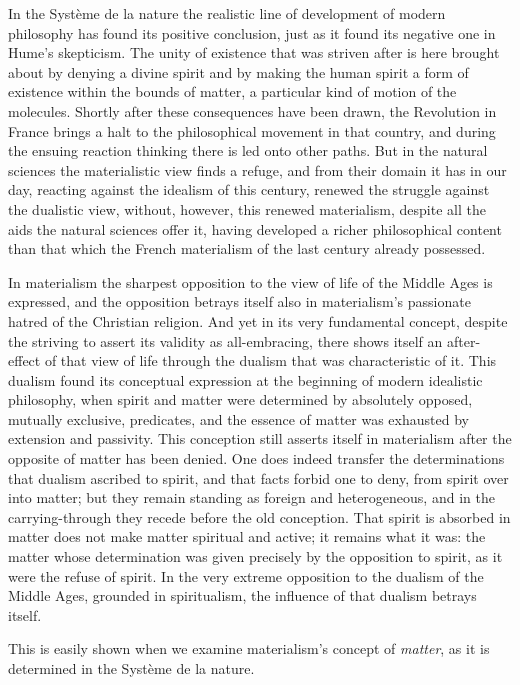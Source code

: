 In the Système de la nature the realistic line of development
of modern philosophy has found its positive conclusion, just as it
found its negative one in Hume's skepticism. The unity of existence
that was striven after is here brought about by denying a divine spirit
and by making the human spirit a form of existence within the bounds of
matter, a particular kind of motion of the molecules. Shortly after
these consequences have been drawn, the Revolution in France brings a
halt to the philosophical movement in that country, and during the
ensuing reaction thinking there is led onto other paths. But in the
natural sciences the materialistic view finds a refuge, and from their
domain it has in our day, reacting against the idealism of this
century, renewed the struggle against the dualistic view, without,
however, this renewed materialism, despite all the aids the natural
sciences offer it, having developed a richer philosophical content than
that which the French materialism of the last century already
possessed.

In materialism the sharpest opposition to the view of life of the
Middle Ages is expressed, and the opposition betrays itself also in
materialism's passionate hatred of the Christian religion. And yet in
its very fundamental concept, despite the striving to assert its
validity as all-embracing, there shows itself an after-effect of that
view of life through the dualism that was characteristic of it. This
dualism found its conceptual expression at the beginning of modern
idealistic philosophy, when spirit and matter were determined by
absolutely opposed, mutually exclusive, predicates, and the essence of
matter was exhausted by extension and passivity. This conception still
asserts itself in materialism after the opposite of matter has been
denied. One does indeed transfer the determinations that dualism
ascribed to spirit, and that facts forbid one to deny, from spirit over
into matter; but they remain standing as foreign and heterogeneous, and
in the carrying-through they recede before the old conception. That
spirit is absorbed in matter does not make matter spiritual
and active; it remains what it was: the matter whose determination was
given precisely by the opposition to spirit, as it were the refuse of
spirit. In the very extreme opposition to the dualism of the Middle
Ages, grounded in spiritualism, the influence of that dualism betrays
itself.

This is easily shown when we examine materialism's concept of
\emph{matter}, as it is determined in the Système de la nature.

